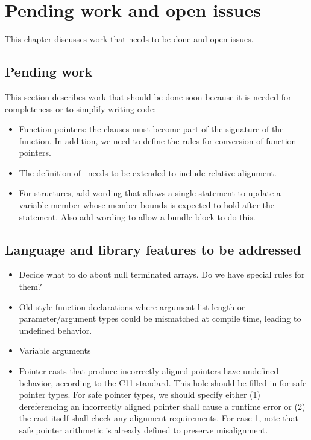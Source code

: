 
\chapter{Pending work and open issues}
\label{chapter:open-issues}

This chapter discusses work that needs to be done and open issues.

\section{Pending work}

This section describes work that should be done soon because it is
needed for completeness or to simplify writing code:
\begin{itemize}
\item
  Function pointers: the  clauses must become part of the signature
  of the function.  In addition, we need to define the 
  rules for conversion of function pointers.
\item The definition of \arrayviewT\ needs to be extended to include
      relative alignment.
\item For structures, add wording that allows a single statement  
to update a variable member whose member bounds is expected to hold after
the statement.  Also add wording to allow a bundle block to do this.
\end{itemize}

\section{Language and library features to be addressed}

\begin{itemize}
\item
  Decide what to do about null terminated arrays. Do we have special rules
  for them?
\item
  Old-style function declarations where argument list length or
  parameter/argument types could be mismatched at compile time, leading
  to undefined behavior.
\item
  Variable arguments
\item
  Pointer casts that produce incorrectly aligned pointers have undefined
  behavior, according to the C11 standard. This hole should be filled in
  for safe pointer types. For safe pointer types, we should specify
  either (1) dereferencing an incorrectly aligned pointer shall cause a
  runtime error or (2) the cast itself shall check any alignment
  requirements. For case 1, note that safe pointer arithmetic is already
  defined to preserve misalignment.
\end{itemize}

